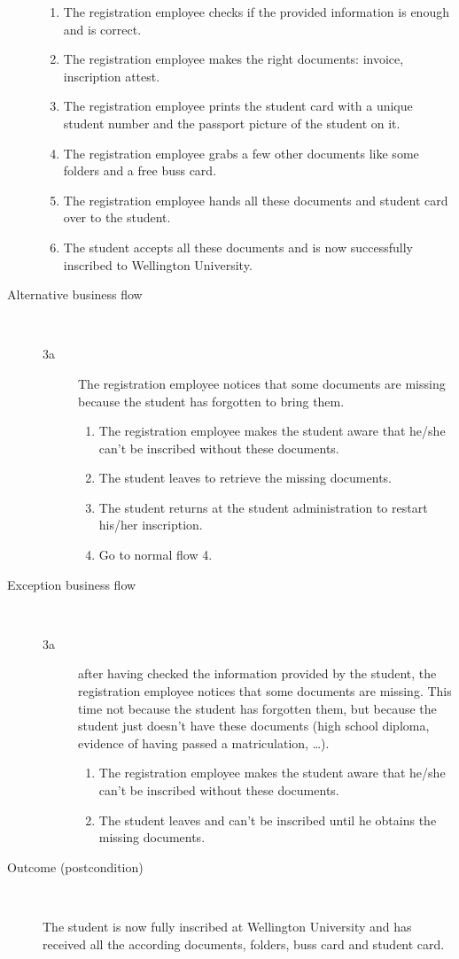 \begin{description}
\begin{enumerate}
	  	\item The registration employee checks if the provided information is enough
	  	and is correct.
	  	\item The registration employee makes the right documents: invoice,
	  	inscription attest.
	  	\item The registration employee prints the student card with a unique
	  	student number and the passport picture of the student on it.
	  	\item The registration employee grabs a few other documents like some
	  	folders and a free buss card.
	  	\item The registration employee hands all these documents and student card
	  	over to the student.
	  	\item The student accepts all these documents and is now successfully
	  	inscribed to Wellington University.
	\end{enumerate}
	\item[Alternative business flow] \ 
	\begin{description}
  		\item[3a] The registration employee notices that some documents are missing
  		because the student has forgotten to bring them.
  		\begin{enumerate}
  			\item The registration employee makes the student aware that he/she
  			can't be inscribed without these documents.
  			\item The student leaves to retrieve the missing documents.
  			\item The student returns at the student administration to restart his/her
  			inscription.
  			\item Go to normal flow 4.
		\end{enumerate}
	\end{description}
	\item[Exception business flow] \
	\begin{description}
		\item[3a] after having checked the information provided by the student, the
		registration employee notices that some documents are missing. This time not
		because the student has forgotten them, but because the student just doesn't
		have these documents (high school diploma, evidence of having passed a
		matriculation, \ldots).
		\begin{enumerate}
		  \item The registration employee makes the student aware that he/she can't be
		  inscribed without these documents.
		  \item The student leaves and can't be inscribed until he obtains the missing
		  documents.
		\end{enumerate}
	\end{description}
	\item[Outcome (postcondition)] \
	\par The student is now fully inscribed at Wellington University and has
	received all the according documents, folders, buss card and student card.
\end{description}
